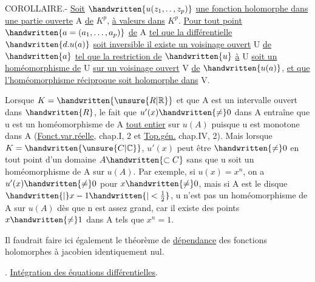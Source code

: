 COROLLAIRE.- \uline{Soit} $\handwritten{u(z_1,\mathinner{\ldotp\ldotp},z_p)}$ \uline{une fonction holomorphe dans une partie ouverte} A \uline{de} $K^p$, \uline{à valeurs dans} $K^p$. \uline{Pour tout point} $\handwritten{a=(a_1,\ldots,a_p)}$ \uline{de} A \uline{tel que la différentielle} $\handwritten{d.u(a)}$ \uline{soit inversible il existe un voisinage ouvert} U \uline{de} $\handwritten{a}$ \uline{tel que la restriction de} $\handwritten{u}$ \uline{à} U \uline{soit un homéomorphisme de} U \uline{sur un voisinage ouvert} V \uline{de} $\handwritten{u(a)}$, \uline{et que l'homéomorphisme réciproque soit holomorphe dans} V.

Lorsque $K=\handwritten{\unsure{R|\mathbb{R}}}$ et que A est un intervalle ouvert dans $\handwritten{R}$, le fait que $u'(x)\handwritten{\neq}0$ dans A entraîne que u est un homéomorphisme de A \uline{tout entier} sur $u(A)$ puisque u est monotone dans A (\uline{Fonct.var.réelle}, chap.I, \handwritten{\S}2 et \uline{Top.gén.} chap.IV, \handwritten{\S}2). Mais lorsque $K=\handwritten{\unsure{C|\mathbb{C}}}$, $u'(x)$ peut être $\handwritten{\neq}0$ en tout point d'un domaine $A\handwritten{\subset C}$ sans que u soit un homéomorphisme de A sur $u(A)$. Par exemple, si $u(x)=x^n$, on a $u'(x)\handwritten{\neq}0$ pour $x\handwritten{\neq}0$, mais si A est le disque $\handwritten{|}x-1\handwritten{|<\frac{1}{2}}$, u n'est pas un homéomorphisme de A sur $u(A)$ dès que n est assez grand, car il existe des points $x\handwritten{\neq}1$ dans A tels que $x^n=1$.

Il faudrait faire ici également le théorème de \uline{dépendance} des fonctions holomorphes à jacobien identiquement nul.

. \uline{Intégration des équations différentielles}.

